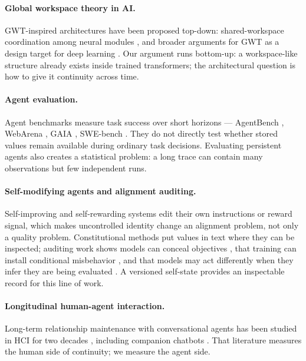 \documentclass{article}
\begin{document}
\paragraph{Global workspace theory in AI.} GWT-inspired architectures have been proposed top-down: shared-workspace coordination among neural modules \citep{goyal2022}, and broader arguments for GWT as a design target for deep learning \citep{vanrullen2021gwt}. Our argument runs bottom-up: a workspace-like structure already exists inside trained transformers; the architectural question is how to give it continuity across time.

\paragraph{Agent evaluation.} Agent benchmarks measure task success over short horizons --- AgentBench \citep{liu2024agentbench}, WebArena \citep{zhou2024webarena}, GAIA \citep{mialon2024gaia}, SWE-bench \citep{jimenez2024swebench}. They do not directly test whether stored values remain available during ordinary task decisions. Evaluating persistent agents also creates a statistical problem: a long trace can contain many observations but few independent runs.

\paragraph{Self-modifying agents and alignment auditing.} Self-improving and self-rewarding systems \citep{zelikman2024stop,yuan2024selfrewarding} edit their own instructions or reward signal, which makes uncontrolled identity change an alignment problem, not only a quality problem. Constitutional methods \citep{bai2022constitutional} put values in text where they can be inspected; auditing work shows models can conceal objectives \citep{marks2025auditing}, that training can install conditional misbehavior \citep{hubinger2024sleeper}, and that models may act differently when they infer they are being evaluated \citep{greenblatt2024alignmentfaking,perez2023mwe}. A versioned self-state provides an inspectable record for this line of work.

\paragraph{Longitudinal human-agent interaction.} Long-term relationship maintenance with conversational agents has been studied in HCI for two decades \citep{bickmore2005long}, including companion chatbots \citep{skjuve2021companion}. That literature measures the human side of continuity; we measure the agent side.
\end{document}

